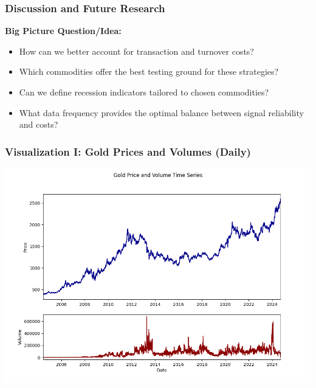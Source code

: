 \documentclass[9pt]{beamer}  %
\begin{document}
\begin{frame}
    \frametitle{Discussion and Future Research}  %
    
\begin{tcolorbox}[colframe=blue!70, colback=blue!10, coltitle=black, sharp corners=southwest, boxrule=0.9mm, width=1.0\textwidth, enlarge left by=0.22cm, enlarge right by=0.5cm]
    \textbf {Big Picture Question/Idea:}  %
    \begin{itemize}  %
        \item How can we better account for transaction and turnover costs?
        \item Which commodities offer the best testing ground for these strategies?
        \item Can we define recession indicators tailored to chosen commodities?
        \item What data frequency provides the optimal balance between signal reliability and costs?
    \end{itemize}
\end{tcolorbox}
\end{frame}

\begin{frame}
    \frametitle{Visualization I: Gold Prices and Volumes (Daily)}  %
    \begin{center}
        \includegraphics[width=\textwidth, height=0.8\textheight, keepaspectratio]{gold_price_volume.png}  %
    \end{center}
\end{frame}
\end{document}
